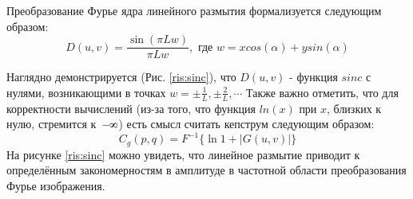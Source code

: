  Преобразование Фурье ядра линейного размытия формализуется следующим образом:
\begin{equation}
D(u, v)=\frac{\sin (\pi L w)}{\pi L w}, \text{ где } w = x cos(\alpha) + y sin(\alpha)
\label{motion_blur_fourier}
\end{equation}
\par

Наглядно демонстрируется (Рис. \ref{ris:sinc}), что $D(u,v)$ - функция $sinc$ с нулями, возникающими в точках $w=\pm \frac{1}{L}, \pm \frac{2}{L}, \cdots$
Также важно отметить, что для корректности вычислений (из-за того, что функция $ln(x)$ 
при $x$, близких к нулю, стремится к~$-\infinity$) есть смысл считать кепструм следующим образом:
$$C_{g}(p, q)=F^{-1}\{\ln 1+ |G(u, v)|\}$$
На рисунке \ref{ris:sinc} можно увидеть, что линейное размытие приводит к определённым закономерностям в амплитуде в частотной области преобразования Фурье изображения.
\par

